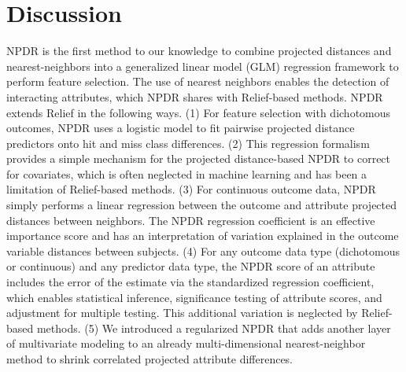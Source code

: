 \documentclass{bioinfo}
\begin{document}
\section{Discussion}
NPDR is the first method to our knowledge to combine projected distances and nearest-neighbors into a generalized linear model (GLM) regression framework to perform feature selection.
The use of nearest neighbors enables the detection of interacting attributes, which NPDR shares with Relief-based methods. NPDR extends Relief in the following ways.
(1) For feature selection with dichotomous outcomes, NPDR uses a logistic model to fit pairwise projected distance predictors onto hit and miss class differences.
(2) This regression formalism provides a simple mechanism for the projected distance-based NPDR to correct for covariates, which is often neglected in machine learning and has been a limitation of Relief-based methods.
(3) For continuous outcome data, NPDR simply performs a linear regression between the outcome and attribute projected distances between neighbors. The NPDR regression coefficient is an effective importance score and has an interpretation of variation explained in the outcome variable distances between subjects.
(4) For any outcome data type (dichotomous or continuous) and any predictor data type, the NPDR score of an attribute includes the error of the estimate via the standardized regression coefficient, which enables statistical inference, significance testing of attribute scores, and adjustment for multiple testing. This additional variation is neglected by Relief-based methods.
(5) We introduced a regularized NPDR that adds another layer of multivariate modeling to an already multi-dimensional nearest-neighbor method to shrink correlated projected attribute differences.

\end{document}
